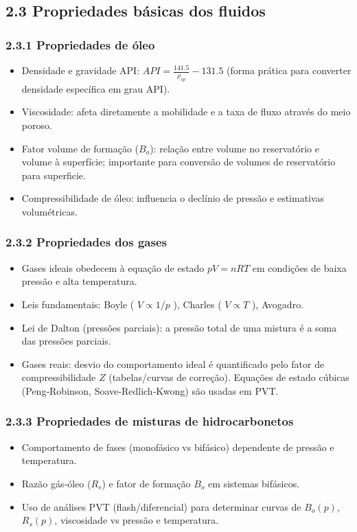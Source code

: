 \documentclass[11pt,a4paper]{article}
\begin{document}
\subsection{2.3 Propriedades básicas dos fluidos}

\subsubsection{2.3.1 Propriedades de óleo}
\begin{itemize}
\item Densidade e gravidade API: $API = \frac{141.5}{\rho_{sp}} - 131.5$ (forma prática para converter densidade específica em grau API).
\item Viscosidade: afeta diretamente a mobilidade e a taxa de fluxo através do meio poroso.
\item Fator volume de formação ($B_o$): relação entre volume no reservatório e volume à superfície; importante para conversão de volumes de reservatório para superficie.
\item Compressibilidade de óleo: influencia o declínio de pressão e estimativas volumétricas.
\end{itemize}

\subsubsection{2.3.2 Propriedades dos gases}
\begin{itemize}
\item Gases ideais obedecem à equação de estado $pV = nRT$ em condições de baixa pressão e alta temperatura.
\item Leis fundamentais: Boyle ( $V\propto 1/p$ ), Charles ( $V\propto T$ ), Avogadro.
\item Lei de Dalton (pressões parciais): a pressão total de uma mistura é a soma das pressões parciais.
\item Gases reais: desvio do comportamento ideal é quantificado pelo fator de compressibilidade $Z$ (tabelas/curvas de correção). Equações de estado cúbicas (Peng‑Robinson, Soave‑Redlich‑Kwong) são usadas em PVT.
\end{itemize}

\subsubsection{2.3.3 Propriedades de misturas de hidrocarbonetos}
\begin{itemize}
\item Comportamento de fases (monofásico vs bifásico) dependente de pressão e temperatura.
\item Razão gás‑óleo ($R_s$) e fator de formação $B_o$ em sistemas bifásicos.
\item Uso de análises PVT (flash/diferencial) para determinar curvas de $B_o(p)$, $R_s(p)$, viscosidade vs pressão e temperatura.
\end{itemize}
\end{document}
